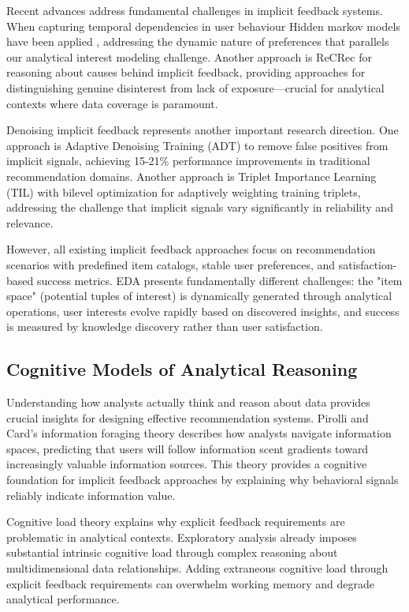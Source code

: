 \documentclass[sigconf, nonacm]{acmart}
\begin{document}
Recent advances address fundamental challenges in implicit feedback systems. When capturing temporal dependencies in user behaviour Hidden markov models have been applied \cite{wang2018modeling},  addressing the dynamic nature of preferences that parallels our analytical interest modeling challenge. Another approach is ReCRec \cite{lin2024recrec} for reasoning about causes behind implicit feedback, providing approaches for distinguishing genuine disinterest from lack of exposure—crucial for analytical contexts where data coverage is paramount.

Denoising implicit feedback represents another important research direction. One approach is Adaptive Denoising Training (ADT) \cite{wang2021denoising}  to remove false positives from implicit signals, achieving 15-21\% performance improvements in traditional recommendation domains. Another approach is Triplet Importance Learning (TIL) \cite{wu2022adapting} with bilevel optimization for adaptively weighting training triplets, addressing the challenge that implicit signals vary significantly in reliability and relevance.

However, all existing implicit feedback approaches focus on recommendation scenarios with predefined item catalogs, stable user preferences, and satisfaction-based success metrics. EDA presents fundamentally different challenges: the "item space" (potential tuples of interest) is dynamically generated through analytical operations, user interests evolve rapidly based on discovered insights, and success is measured by knowledge discovery rather than user satisfaction.

\subsection{Cognitive Models of Analytical Reasoning}

Understanding how analysts actually think and reason about data provides crucial insights for designing effective recommendation systems. Pirolli and Card's information foraging theory \cite{pirolli2005information} describes how analysts navigate information spaces, predicting that users will follow information scent gradients toward increasingly valuable information sources. This theory provides a cognitive foundation for implicit feedback approaches by explaining why behavioral signals reliably indicate information value.

Cognitive load theory \cite{sweller1988cognitive} explains why explicit feedback requirements are problematic in analytical contexts. Exploratory analysis already imposes substantial intrinsic cognitive load through complex reasoning about multidimensional data relationships. Adding extraneous cognitive load through explicit feedback requirements can overwhelm working memory and degrade analytical performance.
\end{document}
